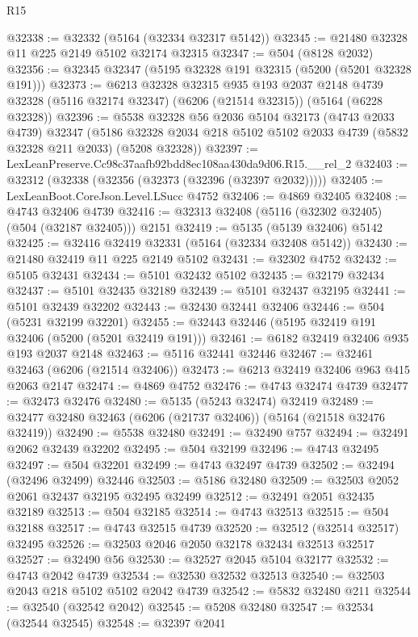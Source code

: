 \begin{lexlean}{R15}
\begin{coremodule}
{{{{{{{{{{{@32338 := @32332 (@5164 (@32334 @32317 @5142))
@32345 := @21480 @32328 @11 @225 @2149 @5102 @32174 @32315
@32347 := @504 (@8128 @2032)
@32356 := @32345 @32347 (@5195 @32328 @191 @32315 (@5200 (@5201 @32328 @191)))
@32373 := @6213
    @32328
    @32315
    @935
    @193
    @2037
    @2148
    @4739
    @32328
    (@5116 @32174 @32347)
    (@6206 (@21514 @32315))
    (@5164 (@6228 @32328))
@32396 := @5538
    @32328
    @56
    @2036
    @5104
    @32173
    (@4743 @2033 @4739)
    @32347
    (@5186 @32328 @2034 @218 @5102 @5102 @2033 @4739 (@5832 @32328 @211 @2033) (@5208 @32328))
@32397 := LexLeanPreserve.Cc98c37aafb92bdd8ec108aa430da9d06.R15.__rel_2
@32403 := @32312 (@32338 (@32356 (@32373 (@32396 (@32397 @2032)))))
@32405 := LexLeanBoot.CoreJson.Level.LSucc @4752
@32406 := @4869 @32405
@32408 := @4743 @32406 @4739
@32416 := @32313 @32408 (@5116 (@32302 @32405) (@504 (@32187 @32405))) @2151
@32419 := @5135 (@5139 @32406) @5142
@32425 := @32416 @32419 @32331 (@5164 (@32334 @32408 @5142))
@32430 := @21480 @32419 @11 @225 @2149 @5102
@32431 := @32302 @4752
@32432 := @5105 @32431
@32434 := @5101 @32432 @5102
@32435 := @32179 @32434
@32437 := @5101 @32435 @32189
@32439 := @5101 @32437 @32195
@32441 := @5101 @32439 @32202
@32443 := @32430 @32441 @32406
@32446 := @504 (@5231 @32199 @32201)
@32455 := @32443 @32446 (@5195 @32419 @191 @32406 (@5200 (@5201 @32419 @191)))
@32461 := @6182 @32419 @32406 @935 @193 @2037 @2148
@32463 := @5116 @32441 @32446
@32467 := @32461 @32463 (@6206 (@21514 @32406))
@32473 := @6213 @32419 @32406 @963 @415 @2063 @2147
@32474 := @4869 @4752
@32476 := @4743 @32474 @4739
@32477 := @32473 @32476
@32480 := @5135 (@5243 @32474) @32419
@32489 := @32477 @32480 @32463 (@6206 (@21737 @32406)) (@5164 (@21518 @32476 @32419))
@32490 := @5538 @32480
@32491 := @32490 @757
@32494 := @32491 @2062 @32439 @32202
@32495 := @504 @32199
@32496 := @4743 @32495
@32497 := @504 @32201
@32499 := @4743 @32497 @4739
@32502 := @32494 (@32496 @32499) @32446
@32503 := @5186 @32480
@32509 := @32503 @2052 @2061 @32437 @32195 @32495 @32499
@32512 := @32491 @2051 @32435 @32189
@32513 := @504 @32185
@32514 := @4743 @32513
@32515 := @504 @32188
@32517 := @4743 @32515 @4739
@32520 := @32512 (@32514 @32517) @32495
@32526 := @32503 @2046 @2050 @32178 @32434 @32513 @32517
@32527 := @32490 @56
@32530 := @32527 @2045 @5104 @32177
@32532 := @4743 @2042 @4739
@32534 := @32530 @32532 @32513
@32540 := @32503 @2043 @218 @5102 @5102 @2042 @4739
@32542 := @5832 @32480 @211
@32544 := @32540 (@32542 @2042)
@32545 := @5208 @32480
@32547 := @32534 (@32544 @32545)
@32548 := @32397 @2041
}}}}}}}}}}}
\end{coremodule}
\end{lexlean}
